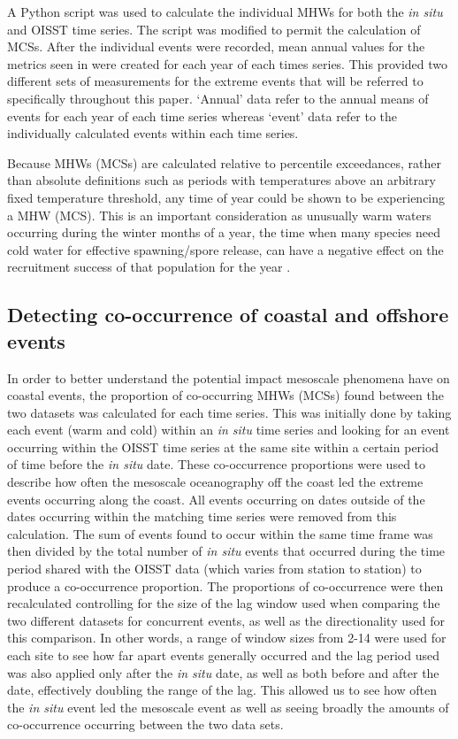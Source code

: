 \documentclass[a4paper,10pt,review]{elsarticle}
\begin{document}
A Python script \citep[https://github.com/ecjoliver/marineHeatWaves; see][]{Hobday2016} was used to calculate the individual MHWs for both the \emph{in situ} and OISST time series. The script was modified to permit the calculation of MCSs. After the individual events were recorded, mean annual values for the metrics seen in  were created for each year of each times series. This provided two different sets of measurements for the extreme events that will be referred to specifically throughout this paper. `Annual' data refer to the annual means of events for each year of each time series whereas `event' data refer to the individually calculated events within each time series.

Because MHWs (MCSs) are calculated relative to percentile exceedances, rather than absolute definitions such as periods with temperatures above an arbitrary fixed temperature threshold, any time of year could be shown to be experiencing a MHW (MCS). This is an important consideration as unusually warm waters occurring during the winter months of a year, the time when many species need cold water for effective spawning/spore release, can have a negative effect on the recruitment success of that population for the year \citep{Wernberg2011}.

\subsection{Detecting co-occurrence of coastal and offshore events}
In order to better understand the potential impact mesoscale phenomena have on coastal events, the proportion of co-occurring MHWs (MCSs) found between the two datasets was calculated for each time series. This was initially done by taking each event (warm and cold) within an \emph{in situ} time series and looking for an event occurring within the OISST time series at the same site within a certain period of time before the \emph{in situ} date. These co-occurrence proportions were used to describe how often the mesoscale oceanography off the coast led the extreme events occurring along the coast. All events occurring on dates outside of the dates occurring within the matching time series were removed from this calculation. The sum of events found to occur within the same time frame was then divided by the total number of \emph{in situ} events that occurred during the time period shared with the OISST data (which varies from station to station) to produce a co-occurrence proportion. The proportions of co-occurrence were then recalculated controlling for the size of the lag window used when comparing the two different datasets for concurrent events, as well as the directionality used for this comparison. In other words, a range of window sizes from 2-14 were used for each site to see how far apart events generally occurred and the lag period used was also applied only after the \emph{in situ} date, as well as both before and after the date, effectively doubling the range of the lag. This allowed us to see how often the \emph{in situ} event led the mesoscale event as well as seeing broadly the amounts of co-occurrence occurring between the two data sets.
\end{document}
